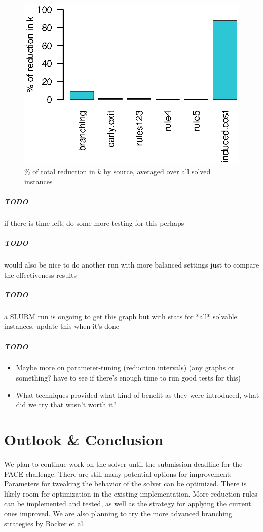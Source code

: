 \documentclass[12pt,oneside,english,parskip=full,headings=small]{scrbook}
\newcommand{\todo}[1]{\paragraph{TODO} #1}
\theoremstyle{definition}
\begin{document}
\begin{figure}[h]
	\centering
	\includegraphics[scale=0.8]{interleaved_effectiveness}
	\caption{\% of total reduction in $k$ by source, averaged over all solved instances}
	\label{fig:interleaved_effectiveness}
\end{figure}

\todo if there is time left, do some more testing for this perhaps

\todo would also be nice to do another run with more balanced settings just to compare the
effectiveness results

\todo a SLURM run is ongoing to get this graph but with stats for *all* solvable instances, update
this when it's done

\todo

\begin{itemize}
	\item Maybe more on parameter-tuning (reduction intervals) (any graphs or something? have to see
		if there's enough time to run good tests for this)
	\item What techniques provided what kind of benefit as they were introduced, what did we try
		that wasn't worth it?
\end{itemize}

\chapter{Outlook \& Conclusion}

We plan to continue work on the solver until the submission deadline for the PACE challenge. There
are still many potential options for improvement: Parameters for tweaking the behavior of the
solver can be optimized. There is likely room for optimization in the existing implementation. More
reduction rules can be implemented and tested, as well as the strategy for applying the current ones
improved. We are also planning to try the more advanced branching strategies by Böcker et
al.~\cite{GoldenRatio}
\end{document}

